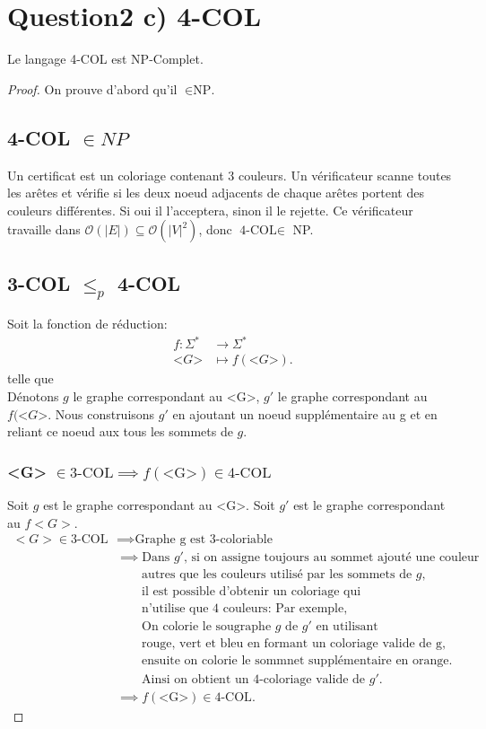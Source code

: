 \documentclass{article}
\theoremstyle{definition}
\theoremstyle{remark}
\begin{document}
\section*{Question2 c) 4-COL}
Le langage 4-COL est NP-Complet.
\begin{proof}
	On prouve d'abord qu'il $\in \text{NP.}$ 
	\subsection {4-COL $\in NP$}
	Un certificat est un coloriage contenant 3 couleurs. Un vérificateur scanne toutes les arêtes et vérifie si les deux noeud adjacents de chaque arêtes portent des couleurs différentes. Si oui il l'acceptera, sinon il le rejette. Ce vérificateur travaille dans $\mathcal{O} \left ( |E| \right ) \subseteq \mathcal{O} \left ( |V|^{2} \right ) $, donc $\text{4-COL} \in $ NP.
	\subsection {3-COL $\le_{p}$ 4-COL }
	Soit la fonction de réduction:
	\begin{align*}
		f: \Sigma^{*} &\longrightarrow \Sigma^{*} \\
		 \text{<}G\text{>}&\longmapsto f(\text{<}G\text{>})  
	.\end{align*}
	telle que \\
	Dénotons $g$ le graphe correspondant au <G>, $g'$ le graphe correspondant au $f(\text{<}G\text{>}$. Nous construisons $g'$ en ajoutant un noeud supplémentaire au g et en reliant ce noeud aux tous les sommets de $g$. 
	\subsubsection{<G> $\in \text{3-COL} \implies f\left( \text{<G>} \right) \in \text{4-COL}$}
	Soit $g$ est le graphe correspondant au <G>. Soit $g'$ est le graphe correspondant au $f<G>$.
	\begin{align*}
		<G> \in \text{3-COL} &\implies \text{Graphe g est 3-coloriable }\\
	&\implies \text{Dans $g'$, si on assigne toujours au sommet ajouté une couleur} \\
	&\qquad \text{autres que les couleurs utilisé par les sommets de } g,\\
	&\qquad \text{il est possible d'obtenir un coloriage qui} \\
	&\qquad \text{n'utilise que 4 couleurs: Par exemple,} \\
	&\qquad \text{On colorie le sougraphe $g$ de $g'$ en utilisant} \\
	&\qquad \text{rouge, vert et bleu en formant un coloriage valide de g, } \\
	&\qquad \text{ensuite on colorie le sommnet supplémentaire en orange.} \\
	&\qquad\text{Ainsi on obtient un 4-coloriage valide de $g'$.}\\ 
	&\implies f\left( \text{<G>} \right) \in \text{4-COL}
	.\end{align*}

\end{proof}
\end{document}
